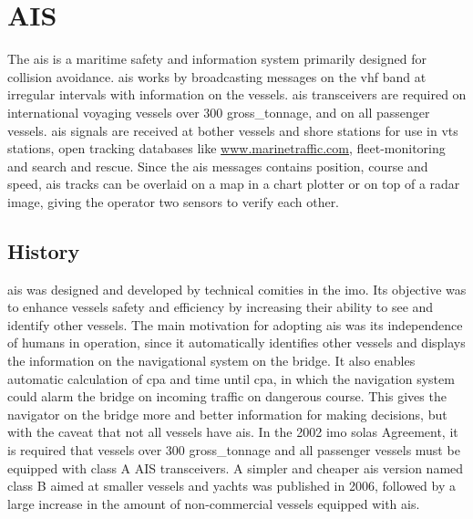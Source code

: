 \section{AIS}
The \acrfull{ais} is a maritime safety and information system primarily designed for collision avoidance. \gls{ais} works by broadcasting messages on the \gls{vhf} band at irregular intervals with information on the vessels. \gls{ais} transceivers are required on international voyaging vessels over 300 \gls{gross_tonnage}, and on all passenger vessels. \gls{ais} signals are received at bother vessels and shore stations for use in \gls{vts} stations, open tracking databases like \url{www.marinetraffic.com}, fleet-monitoring and search and rescue. Since the \gls{ais} messages contains position, course and speed, \gls{ais} tracks can be overlaid on a map in a chart plotter or on top of a radar image, giving the operator two sensors to verify each other.

\subsection{History}
\gls{ais} was designed and developed by technical comities in the \gls{imo}. Its objective was to enhance vessels safety and efficiency by increasing their ability to see and identify other vessels. The main motivation for adopting \gls{ais} was its independence of humans in operation, since it automatically identifies other vessels and displays the information on the navigational system on the bridge. It also enables automatic calculation of \gls{cpa} and time until \gls{cpa}, in which the navigation system could alarm the bridge on incoming traffic on dangerous course. This gives the navigator on the bridge more and better information for making decisions, but with the caveat that not all vessels have \gls{ais}. In the 2002 \gls{imo} \gls{solas} Agreement, it is required that vessels over 300 \gls{gross_tonnage} and all passenger vessels must be equipped with class A AIS transceivers. A simpler and cheaper \gls{ais} version named class B aimed at smaller vessels and yachts was published in 2006, followed by a large increase in the amount of non-commercial vessels equipped with \gls{ais}.


